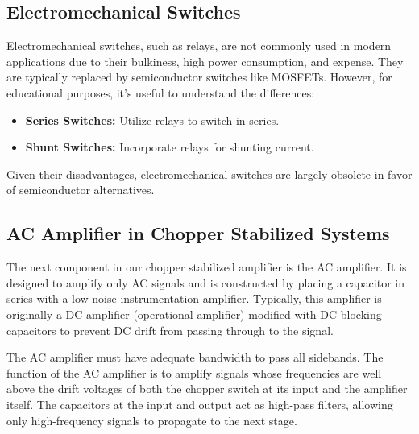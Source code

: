 \subsection{Electromechanical Switches}
Electromechanical switches, such as relays, are not commonly used in modern applications due to their bulkiness, high power consumption, and expense. They are typically replaced by semiconductor switches like MOSFETs. However, for educational purposes, it's useful to understand the differences:
\begin{itemize}
    \item \textbf{Series Switches:} Utilize relays to switch in series.
    \item \textbf{Shunt Switches:} Incorporate relays for shunting current.
\end{itemize}
Given their disadvantages, electromechanical switches are largely obsolete in favor of semiconductor alternatives.

\subsection{AC Amplifier in Chopper Stabilized Systems}
The next component in our chopper stabilized amplifier is the AC amplifier. It is designed to amplify only AC signals and is constructed by placing a capacitor in series with a low-noise instrumentation amplifier. Typically, this amplifier is originally a DC amplifier (operational amplifier) modified with DC blocking capacitors to prevent DC drift from passing through to the signal.

The AC amplifier must have adequate bandwidth to pass all sidebands. The function of the AC amplifier is to amplify signals whose frequencies are well above the drift voltages of both the chopper switch at its input and the amplifier itself. The capacitors at the input and output act as high-pass filters, allowing only high-frequency signals to propagate to the next stage.

